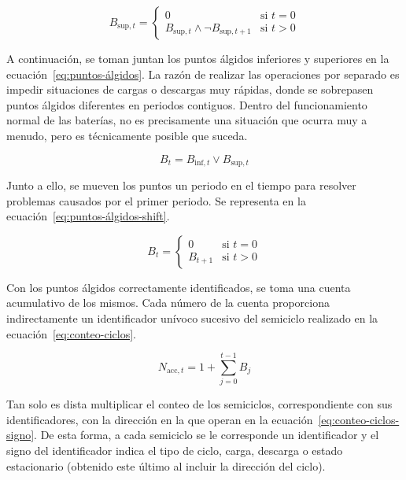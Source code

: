 \begin{equation}
\label{eq:entrada-sup}
B_{\text{sup}, t} = \begin{cases}
0                                                & \text{si } t = 0 \\
B_{\text{sup}, t} \land \neg B_{\text{sup}, t+1} & \text{si } t > 0
\end{cases}
\end{equation}

A continuación, se toman juntan los puntos álgidos inferiores y superiores en la ecuación~\ref{eq:puntos-álgidos}. La razón de realizar las operaciones por separado es impedir situaciones de cargas o descargas muy rápidas, donde se sobrepasen puntos álgidos diferentes en periodos contiguos. Dentro del funcionamiento normal de las baterías, no es precisamente una situación que ocurra muy a menudo, pero es técnicamente posible que suceda.

\begin{equation}
\label{eq:puntos-álgidos}
B_{t} = B_{\text{inf}, t} \lor B_{\text{sup}, t}
\end{equation}

Junto a ello, se mueven los puntos un periodo en el tiempo para resolver problemas causados por el primer periodo. Se representa en la ecuación~\ref{eq:puntos-álgidos-shift}.

\begin{equation}
\label{eq:puntos-álgidos-shift}
B_t = \begin{cases}
0       & \text{si } t = 0 \\
B_{t+1} & \text{si } t > 0
\end{cases}
\end{equation}

Con los puntos álgidos correctamente identificados, se toma una cuenta acumulativo de los mismos. Cada número de la cuenta proporciona indirectamente un identificador unívoco sucesivo del semiciclo realizado en la ecuación~\ref{eq:conteo-ciclos}.

\begin{equation}
\label{eq:conteo-ciclos}
N_{\text{acc}, t} = 1 + \sum_{j=0}^{t-1} B_{j}
\end{equation}

Tan solo es dista multiplicar el conteo de los semiciclos, correspondiente con sus identificadores, con la dirección en la que operan en la ecuación~\ref{eq:conteo-ciclos-signo}. De esta forma, a cada semiciclo se le corresponde un identificador y el signo del identificador indica el tipo de ciclo, carga, descarga o estado estacionario (obtenido este último al incluir la dirección del ciclo).

